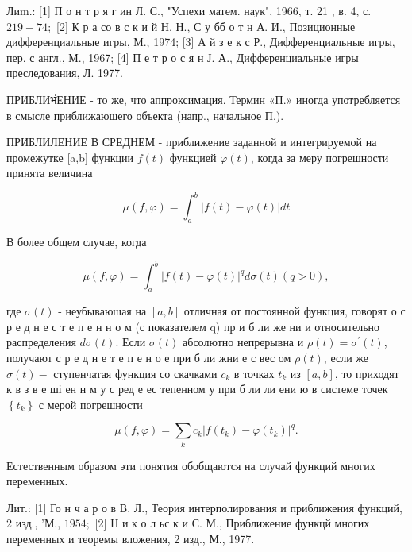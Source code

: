 \documentclass[10pt]{article}
\begin{document}
Лиm.: [1] П о н т р я г ин Л. С., "Успехи матем. наук", 1966, т. 21 , в. 4, с. $219-74 ;$ [2] К р а со в с к и й Н. Н., С у бб о т н А. И., Позиционные дифференциальные игры, М., 1974; [3] А й з е к с Р., Дифференциальные игры, пер. с англ., М., 1967; [4] П е т р о с я н Ј. А., Дифференциальные игры преследования, Л. 1977.



ПРИБЛИभ่ЕНИЕ - то же, что аппроксимация. Термин «П.» иногда употребляется в смысле приближаюшего объекта (напр., начальное П.).



ПРИБЛИЛЕНИЕ В СРЕДНЕМ - приближение заданной и интегрируемой на промежутке [a,b] функции $f(t)$ функцией $\varphi(t)$, когда за меру погрешности принята величина



\[

\mu(f, \varphi)=\int_{a}^{b}|f(t)-\varphi(t)| d t

\]



В более общем случае, когда



\[

\mu(f, \varphi)=\int_{a}^{b}|f(t)-\varphi(t)|^{q} d \sigma(t)(q>0),

\]



где $\sigma(t)$ - неубываюшая на $[a, b]$ отличная от постоянной функция, говорят о с р е д н е с т е п е н н о м (с показателем q) пр и б ли же ни и относительно распределения $d \sigma(t)$. Если $\sigma(t)$ абсолютно непрерывна и $\rho(t)=\sigma^{\prime}(t)$, получают с р е д н е т е п е н о е при б ли жни е с вес ом $\rho(t)$, если же $\sigma(t)-$ ступөнчатая функция со скачками $c_{k}$ в точках $t_{k}$ из $[a, b]$, то приходят к в з в е ші ен н м у с ред е ес тепенном у при б ли ли ени ю в системе точек $\left\{t_{k}\right\}$ с мерой погрешности



\[

\mu(f, \varphi)=\sum_{k} c_{k}\left|f\left(t_{k}\right)-\varphi\left(t_{k}\right)\right|^{q} .

\]



Естественным образом эти понятия обобщаются на случай функций многих переменных.



Лит.: [1] Го н ч а р о в В. Л., Теория интерполирования и приближения функций, 2 изд., 'М., $1954 ;$ [2] Н и к о л ьс к и С. М., Приближение функцй многих переменных и теоремы вложения, 2 изд., М., 1977.
\end{document}
